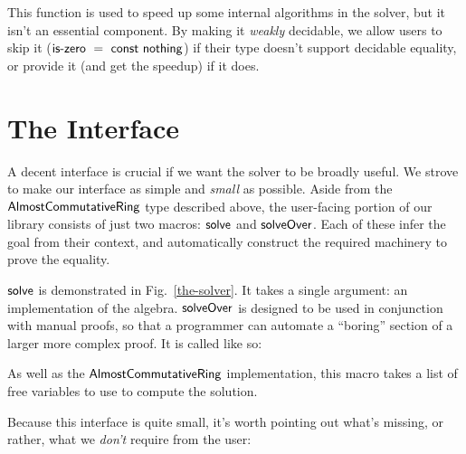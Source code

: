 \documentclass[acmsmall,review,anonymous]{acmart}\settopmatter{printfolios=true,printccs=false,printacmref=false}
\begin{document}
\begin{centering}
\end{centering}

This function is used to speed up some internal algorithms in the solver, but it
isn't an essential component. By making it \emph{weakly} decidable, we allow
users to skip it
(\(\AgdaFunction{is-zero}~=~\AgdaFunction{const}~\AgdaInductiveConstructor{nothing}\))
if their type doesn't support decidable equality, or provide it (and get the
speedup) if it does.
\section{The Interface}
A decent interface is crucial if we want the solver to be broadly useful. We
strove to make our interface as simple and \emph{small} as possible. Aside from
the \(\AgdaDatatype{AlmostCommutativeRing}\) type described above, the
user-facing portion of our library consists of just two macros:
\(\AgdaMacro{solve}\) and \(\AgdaMacro{solveOver}\). Each of these infer the
goal from their context, and automatically construct the required machinery to
prove the equality.

\(\AgdaMacro{solve}\) is demonstrated in Fig.~\ref{the-solver}. It takes a
single argument: an implementation of the algebra. \(\AgdaMacro{solveOver}\) is
designed to be used in conjunction with manual proofs, so that a programmer can
automate a ``boring'' section of a larger more complex proof. It is called like
so:

\begin{centering}
\end{centering}

As well as the \(\AgdaDatatype{AlmostCommutativeRing}\) implementation, this
macro takes a list of free variables to use to compute the solution.

Because this interface is quite small, it's worth pointing out what's missing,
or rather, what we \emph{don't} require from the user:
\end{document}
